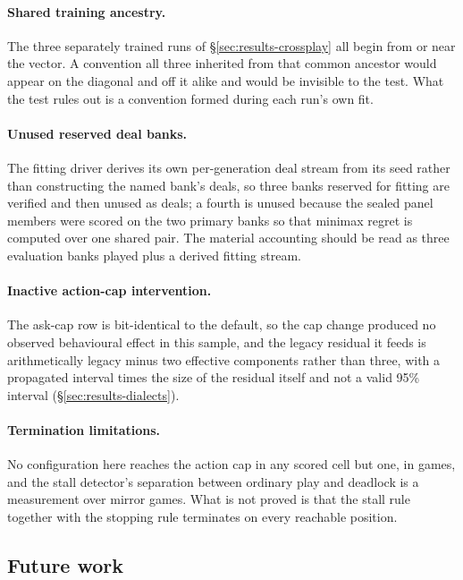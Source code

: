 \paragraph{Shared training ancestry.} The three separately trained runs of
\S\ref{sec:results-crossplay} all begin from or near the \vsix{} vector. A convention all three
inherited from that common ancestor would appear on the diagonal and off it alike and would be
invisible to the test. What the test rules out is a convention formed during each run's own fit.

\paragraph{Unused reserved deal banks.} The fitting driver derives its
own per-generation deal stream from its seed rather than constructing the named bank's deals, so three
banks reserved for fitting are verified and then unused as deals; a fourth is unused because the
sealed panel members were scored on the two primary banks so that minimax regret is computed over one
shared pair. The material accounting should be read as three evaluation banks played plus a derived
fitting stream.

\paragraph{Inactive action-cap intervention.} The ask-cap row is bit-identical to the default, so the
cap change produced no observed behavioural effect in this sample, and the legacy residual it feeds
is arithmetically legacy minus two effective components rather than three, with a propagated
interval \vsevenLegacyResidualRatio{} times the size of the residual itself and not a valid 95\%
interval (\S\ref{sec:results-dialects}).

\paragraph{Termination limitations.} No configuration here reaches the action cap
in any scored cell but one, in \vsevenLimitCellGames{} games, and the stall detector's separation
between ordinary play and deadlock is a measurement over \vsevenStallMirrorGames{} mirror games. What
is not proved is that the stall rule together with the stopping rule terminates on every reachable
position.

\subsection{Future work}
\label{sec:discussion-future}


